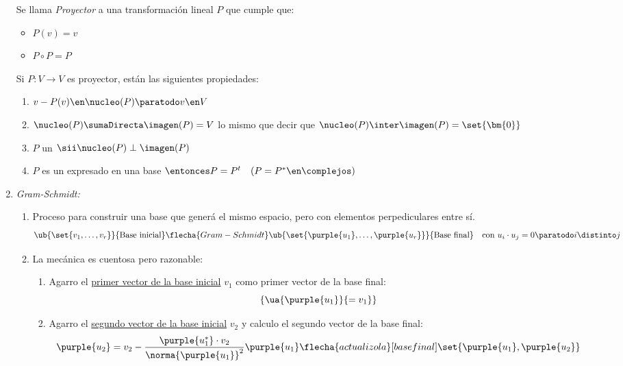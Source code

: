 \begin{enumerate}[label=\tiny\purple{\faIcon{snowman}}]
        Se llama  \textit{Proyector} a una transformación lineal $P$ que cumple que:
        \begin{itemize}
          \item $P(v) = v$
          \item $P \circ P = P$
        \end{itemize}
        Si $P: V \to V$ es proyector, están las siguientes propiedades:
        \begin{enumerate}[label=\poo]
          \item $v - P(v) \en \nucleo(P) \paratodo v \en V$
          \item  $ \nucleo(P) \sumaDirecta \imagen(P) = V$
                lo mismo que decir que
                $\nucleo(P) \inter \imagen(P) = \set{\bm{0}}$
          \item $P$ un \textit{}
                $\sii \nucleo(P) \perp \imagen(P)$
          \item $P$ es un \textit{} expresado en una base \textit{}
                $\entonces P = P^t \quad (P = P^* \en \complejos)$
        \end{enumerate}

  \item \textit{Gram-Schmidt:}
        \begin{enumerate}[label={\tiny\faIcon{pray}$_{\arabic*)}$}]
          \item Proceso para construir una base que generá el mismo espacio, pero con elementos perpediculares entre sí.
                $$
                  \ub{\set{v_1, \ldots, v_r}}{\text{Base inicial}}
                  \flecha{Gram-Schmidt}
                  \ub{\set{\purple{u_1}, \ldots, \purple{u_r}}}{\text{Base final}}
                  \quad \text{con } u_i \cdot u_j = 0 \paratodo i \distinto j
                $$

          \item La mecánica es cuentosa pero razonable:
                \begin{enumerate}[label=\arabic*)]
                  \item Agarro el \underline{primer vector de la base inicial} $v_1$ como primer vector de la base final:
                        $$
                          \{\ua{\purple{u_1}}{= v_1}\}
                        $$

                  \item Agarro el \underline{segundo vector de la base inicial} $v_2$ y calculo el segundo vector de la base final:
                        $$
                          \purple{u_2} = v_2 - \frac{\purple{u_1^*} \cdot v_2}{\norma{\purple{u_1}}^2}\purple{u_1}
                          \flecha{actualizo la}[base final]
                          \set{\purple{u_1}, \purple{u_2}}
                        $$


\end{enumerate}
\end{enumerate}
\end{enumerate}
